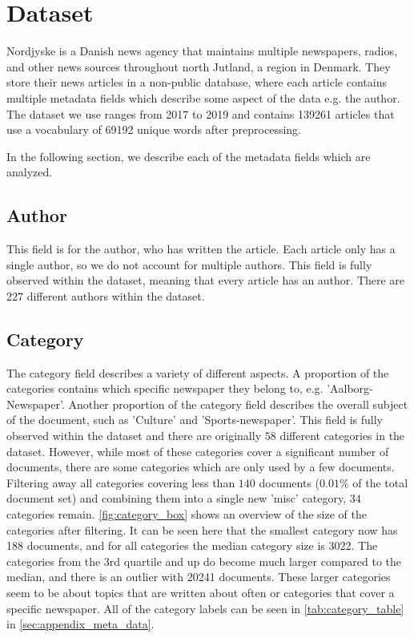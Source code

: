 \section{Dataset}\label{sec:dataset}
Nordjyske is a Danish news agency that maintains multiple newspapers, radios, and other news sources throughout north Jutland, a region in Denmark.
They store their news articles in a non-public database, where each article contains multiple metadata fields which describe some aspect of the data e.g. the author.
The dataset we use ranges from 2017 to 2019 and contains 139261 articles that use a vocabulary of 69192 unique words after preprocessing.

In the following section, we describe each of the metadata fields which are analyzed.

\subsection{Author}
This field is for the author, who has written the article.
Each article only has a single author, so we do not account for multiple authors.
This field is fully observed within the dataset, meaning that every article has an author.
There are $227$ different authors within the dataset.

\subsection{Category}
The category field describes a variety of different aspects.
A proportion of the categories contains which specific newspaper they belong to, e.g. 'Aalborg-Newspaper'.
Another proportion of the category field describes the overall subject of the document, such as 'Culture' and 'Sports-newspaper'.
This field is fully observed within the dataset and there are originally $58$ different categories in the dataset.
However, while most of these categories cover a significant number of documents, there are some categories which are only used by a few documents.
Filtering away all categories covering less than $140$ documents ($0.01\%$ of the total document set) and combining them into a single new 'misc' category, $34$ categories remain.
\autoref{fig:category_box} shows an overview of the size of the categories after filtering.
It can be seen here that the smallest category now has 188 documents, and for all categories the median category size is 3022.
The categories from the 3rd quartile and up do become much larger compared to the median, and there is an outlier with 20241 documents.
These larger categories seem to be about topics that are written about often or categories that cover a specific newspaper.
All of the category labels can be seen in \autoref{tab:category_table} in \autoref{sec:appendix_meta_data}.

